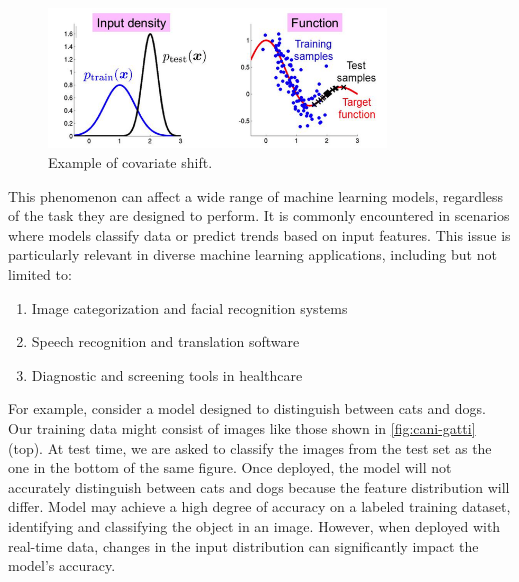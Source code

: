 \begin{figure}[H]
	\centering
	\includegraphics[width=0.8\textwidth]{assets/immagine.png} 
	\caption{Example of covariate shift.}
	\label{fig:covariate-shift}
\end{figure}

This phenomenon can affect a wide range of machine learning models, regardless of the task they are designed to perform. It is commonly encountered in scenarios where models classify data or predict trends based on input features. This issue is particularly relevant in diverse machine learning applications, including but not limited to:
	
	\begin{enumerate}
		\item Image categorization and facial recognition systems
		\item Speech recognition and translation software
		\item Diagnostic and screening tools in healthcare
	\end{enumerate}
	
For example, consider a model designed to distinguish between cats and dogs. Our training data might consist of images like those shown in \cref{fig:cani-gatti} (top). At test time, we are asked to classify the images from the test set as the one in the bottom of the same figure. Once deployed, the model will not accurately distinguish between cats and dogs because the feature distribution will differ. Model may achieve a high degree of accuracy on a labeled training dataset, identifying and classifying the object in an image. However, when deployed with real-time data, changes in the input distribution can significantly impact the model's accuracy.

